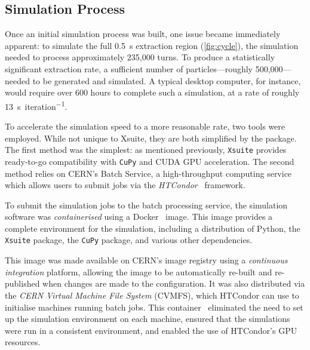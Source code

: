 \documentclass[a4paper,twoside,11pt]{report}
\begin{document}
\subsection{Simulation Process}\label{sec:sim_process}

Once an initial simulation process was built, one issue became immediately apparent: to simulate the full \qty{0.5}{\second} extraction region (\autoref{fig:cycle}), the simulation needed to process approximately 235,000 turns. To produce a statistically significant extraction rate, a sufficient number of particles---roughly 500,000---needed to be generated and simulated. A typical desktop computer, for instance, would require over 600 hours to complete such a simulation, at a rate of roughly \qty{13}{\second\per iteration}.

To accelerate the simulation speed to a more reasonable rate, two tools were employed. While not unique to Xsuite, they are both simplified by the package. The first method was the simplest: as mentioned previously, \verb|Xsuite| provides ready-to-go compatibility with \verb|CuPy| and CUDA GPU acceleration. The second method relies on CERN's Batch Service, a high-throughput computing service which allows users to submit jobs via the \textit{HTCondor}~\cite{htcondor} framework. 

To submit the simulation jobs to the batch processing service, the simulation software was \textit{containerised} using a Docker~\cite{merkel2014docker} image. This image provides a complete environment for the simulation, including a distribution of Python, the \verb|Xsuite| package, the \verb|CuPy| package, and various other dependencies. 

This image was made available on CERN's image registry using a \textit{continuous integration} platform, allowing the image to be automatically re-built and re-published when changes are made to the configuration. It was also distributed via the \textit{CERN Virtual Machine File System} (CVMFS), which HTCondor can use to initialise machines running batch jobs. This container~\cite{docker} eliminated the need to set up the simulation environment on each machine, ensured that the simulations were run in a consistent environment, and enabled the use of HTCondor's GPU resources. 
\end{document}
